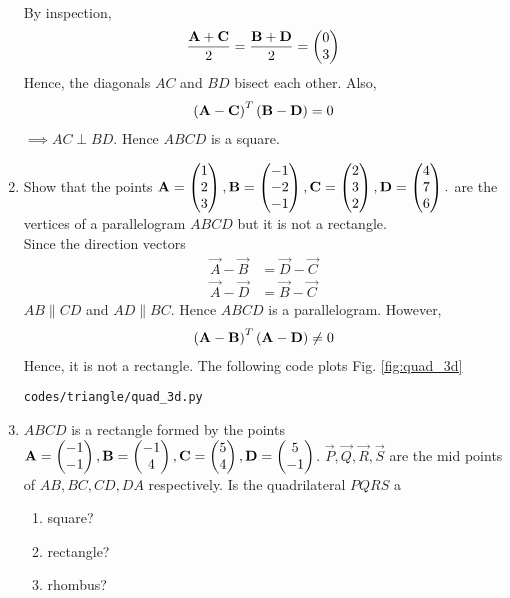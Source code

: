 \documentclass[journal,12pt,twocolumn]{IEEEtran}
\renewcommand\thesection{\arabic{section}}
\begin{document}
\begin{enumerate}[label=\thesection.\arabic*.,ref=\thesection.\theenumi]
\\
\solution By inspection, 
%
\begin{align}
\frac{\mathbf{A}+\mathbf{C}}{2}=\frac{\mathbf{B}+\mathbf{D}}{2} = \begin{pmatrix}0\\3\end{pmatrix}
\end{align}
%
Hence, the diagonals $AC$ and $BD$ bisect each other.
%
Also, 
\begin{align}
\left(\mathbf{A}-\mathbf{C}\right)^T
\left(\mathbf{B}-\mathbf{D}\right) = 0
\end{align}
%
$\implies AC \perp BD $.  Hence $ABCD$ is a square.
\item Show that the points 
$\mathbf{A} = \begin{pmatrix}1\\2\\3\end{pmatrix},
 \mathbf{B} = \begin{pmatrix}-1\\-2\\-1\end{pmatrix},
\mathbf{C} = \begin{pmatrix}2\\3\\2\end{pmatrix},
\mathbf{D} = \begin{pmatrix}4\\7\\6\end{pmatrix}.
$
are the vertices of a parallelogram $ABCD$ but it is not a rectangle.
%
\\
\solution Since the direction vectors
%
\begin{align}
\vec{A}-\vec{B}&= \vec{D}-\vec{C}
\\
\vec{A}-\vec{D}&= \vec{B}-\vec{C}
\end{align}
%
$AB \parallel CD$ and $AD \parallel BC$.  Hence $ABCD$ is a parallelogram.  However, 
%
\begin{align}
\left(\mathbf{A}-\mathbf{B}\right)^T\left( \mathbf{A}-\mathbf{D}\right)\ne 0
\end{align}
%
Hence, it is not a rectangle.
The following code plots Fig. \ref{fig:quad_3d}
%
\begin{lstlisting}
codes/triangle/quad_3d.py
\end{lstlisting}
%
%

\item $ABCD$ is a rectangle formed by the points $\mathbf{A} = \begin{pmatrix}-1\\-1\end{pmatrix}, \mathbf{B} = \begin{pmatrix}-1\\4\end{pmatrix}, \mathbf{C} = \begin{pmatrix}5\\4\end{pmatrix}, \mathbf{D} = \begin{pmatrix}5\\-1\end{pmatrix}$. $ \vec{P}, \vec{Q}, \vec{R}, \vec{S}$ are the mid points of $AB, BC, CD, DA$ respectively.  Is the quadrilateral $PQRS$ a 
\begin{enumerate}
\item square?
\item rectangle?
\item rhombus?
\end{enumerate}
\solution
%
\end{enumerate}
\end{document}
